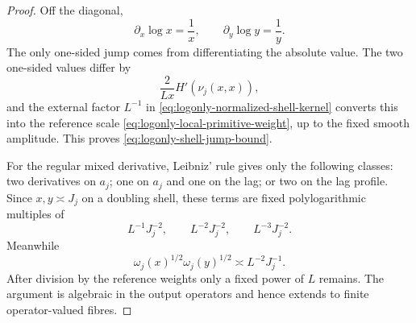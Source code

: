 \begin{proof}
Off the diagonal,
\[
\partial_x\log x=\frac1x,
\qquad
\partial_y\log y=\frac1y.
\]
The only one-sided jump comes from differentiating the absolute value.  The two
one-sided values differ by
\[
\frac{2}{Lx}H'(\nu_j(x,x)),
\]
and the external factor $L^{-1}$ in
\eqref{eq:logonly-normalized-shell-kernel} converts this into the reference
scale \eqref{eq:logonly-local-primitive-weight}, up to the fixed smooth
amplitude.  This proves \eqref{eq:logonly-shell-jump-bound}.

For the regular mixed derivative, Leibniz' rule gives only the following
classes: two derivatives on $a_j$; one on $a_j$ and one on the lag; or two on
the lag profile.  Since $x,y\asymp J_j$ on a doubling shell, these terms are fixed
polylogarithmic multiples of
\[
L^{-1}J_j^{-2},\qquad
L^{-2}J_j^{-2},\qquad
L^{-3}J_j^{-2}.
\]
Meanwhile
\[
\omega_j(x)^{1/2}\omega_j(y)^{1/2}
\asymp L^{-2}J_j^{-1}.
\]
After division by the reference weights only a fixed power of $L$ remains.
The argument is algebraic in the output operators and hence extends to finite
operator-valued fibres.
\end{proof}

